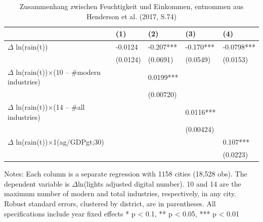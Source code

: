 \hspace{0.1em}

\begin{table}[!hbt]
\caption{Zusammenhang zwischen Feuchtigkeit und Einkommen, 
entnommen aus Henderson et al. (2017, S.74)}
\label{tbl2}
\centering
\begin{threeparttable}
  \begin{tabular}{lllll} 
    \toprule
                                                    & (1)      & (2)       & (3)       & (4)         \\ 
    \midrule
    $\Delta$ ln(rain(t))                            & -0.0124  & -0.207*** & -0.170*** & -0.0798***  \\
                                                    & (0.0124) & (0.0691)  & (0.0549)  & (0.0153)    \\
    $\Delta$ ln(rain(t))×(10 – \#modern industries) & ~        & 0.0199*** & ~         & ~           \\
                                                    & ~        & (0.00720) & ~         & ~           \\
    $\Delta$ ln(rain(t))×(14 – \#all industries)    & ~        & ~         & 0.0116*** & ~           \\
                                                    & ~        & ~         & (0.00424) & ~           \\
    $\Delta$ ln(rain(t))×1(ag/GDPgt;30)             & ~        & ~         & ~         & 0.107***    \\
    ~                                               & ~        & ~         & ~         & (0.0223)    \\
    \bottomrule
  \end{tabular}
  
  \begin{tablenotes}
       \item \small Notes: Each column is a separate regression with 1158 cities (18,528 obs). The dependent variable is $\Delta$ln(lights adjusted digital number). 10 and 14 are the maximum number of modern and total industries, respectively, in any city. Robust standard errors, clustered by district, are in parentheses. All specifications include year fixed effects * p < 0.1, ** p < 0.05, *** p < 0.01 
    \end{tablenotes}

\end{threeparttable}
\end{table}

